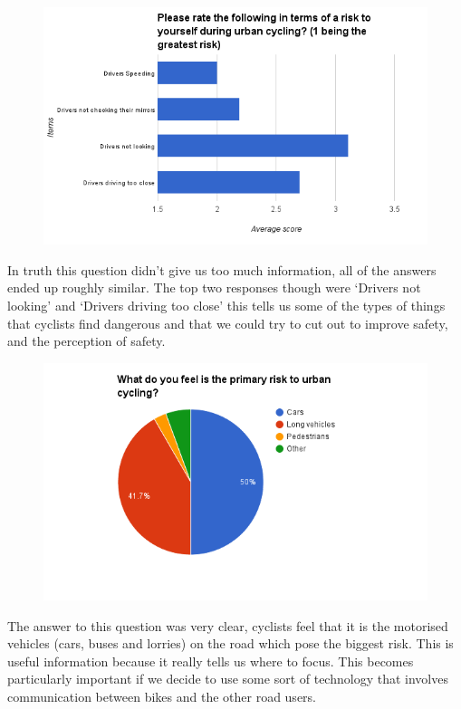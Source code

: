 \documentclass[a4paper]{report}
\begin{document}
{\begin{figure}[H]
\centering
\includegraphics[scale=0.6]{figures/research_report/questionnaires/drivers_5}
\end{figure}
In truth this question didn't give us too much information, all of the answers ended up roughly similar. The top two responses though were `Drivers not looking' and `Drivers driving too close' this tells us some of the types of things that cyclists find dangerous and that we could try to cut out to improve safety, and the perception of safety.
\begin{figure}[H]
\centering
\includegraphics[scale=0.6]{figures/research_report/questionnaires/drivers_6}
\end{figure}
The answer to this question was very clear, cyclists feel that it is the motorised vehicles (cars, buses and lorries) on the road which pose the biggest risk. This is useful information because it really tells us where to focus. This becomes particularly important if we decide to use some sort of technology that involves communication between bikes and the other road users.
}
\end{document}
